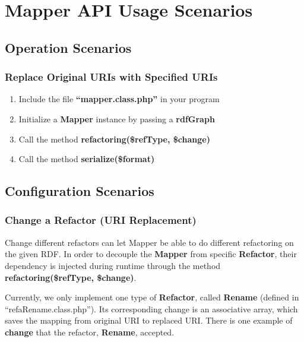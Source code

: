 \documentclass[letterpaper,10pt,english]{sphinxmanual}
\begin{document}
\section{Mapper API Usage Scenarios}
\label{docs/scenarios/mapper:mapper-api-usage-scenarios}\label{docs/scenarios/mapper::doc}

\subsection{Operation Scenarios}
\label{docs/scenarios/mapper:operation-scenarios}

\subsubsection{Replace Original URIs with Specified URIs}
\label{docs/scenarios/mapper:replace-original-uris-with-specified-uris}\begin{enumerate}
\item {} 
Include the file \textbf{``mapper.class.php''} in your program

\item {} 
Initialize a \textbf{Mapper} instance by passing a \textbf{rdfGraph}

\item {} 
Call the method \textbf{refactoring(\$refType, \$change)}

\item {} 
Call the method \textbf{serialize(\$format)}

\end{enumerate}


\subsection{Configuration Scenarios}
\label{docs/scenarios/mapper:configuration-scenarios}

\subsubsection{Change a Refactor (URI Replacement)}
\label{docs/scenarios/mapper:change-a-refactor-uri-replacement}
Change different refactors can let Mapper be able to do different refactoring on the given RDF. In order to decouple the \textbf{Mapper} from specific \textbf{Refactor}, their dependency is injected during runtime through the method \textbf{refactoring(\$refType, \$change)}.

Currently, we only implement one type of \textbf{Refactor}, called \textbf{Rename} (defined in ``refaRename.class.php''). Its corresponding change is an associative array, which saves the mapping from original URI to replaced URI. There is one example of \textbf{change} that the refactor, \textbf{Rename}, accepted.
\end{document}
